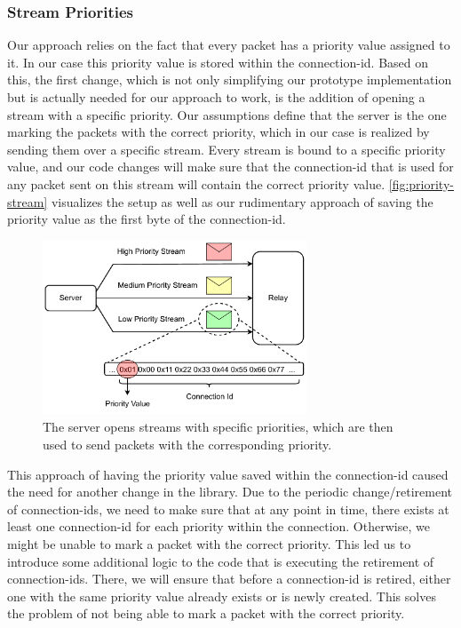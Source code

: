 \subsubsection*{Stream Priorities}
Our approach relies on the fact that every packet has a priority value assigned to it.
In our case this priority value is stored within the connection-id.
Based on this, the first change, which is not only simplifying our prototype implementation but is actually needed for 
our approach to work, is the addition of opening a stream with a specific priority.
Our assumptions define that the server is the one marking the packets with the correct priority, which in 
our case is realized by sending them over a specific stream.
Every stream is bound to a specific priority value, and our code changes will make sure that the connection-id
that is used for any packet sent on this stream will contain the correct priority value.
\autoref{fig:priority-stream} visualizes the setup as well as our rudimentary approach of saving the 
priority value as the first byte of the connection-id.

\vspace{0.5cm}
\begin{figure}[H]
    \centering
    \includegraphics[width=0.7\textwidth]{figures/03_fast_relays/priority-streams.drawio.pdf}
    \caption[Streams with specific priorities]{The server opens streams with specific priorities, 
    which are then used to send packets with the corresponding priority.}\label{fig:priority-stream}
\end{figure}

This approach of having the priority value saved within the connection-id caused the need for another 
change in the library.
Due to the periodic change/retirement of connection-ids, we need to make sure that at any point in time, there 
exists at least one connection-id for each priority within the connection.
Otherwise, we might be unable to mark a packet with the correct priority.
This led us to introduce some additional logic to the code that is executing the retirement of connection-ids.
There, we will ensure that before a connection-id is retired, either one with the same priority value
already exists or is newly created.
This solves the problem of not being able to mark a packet with the correct priority.

